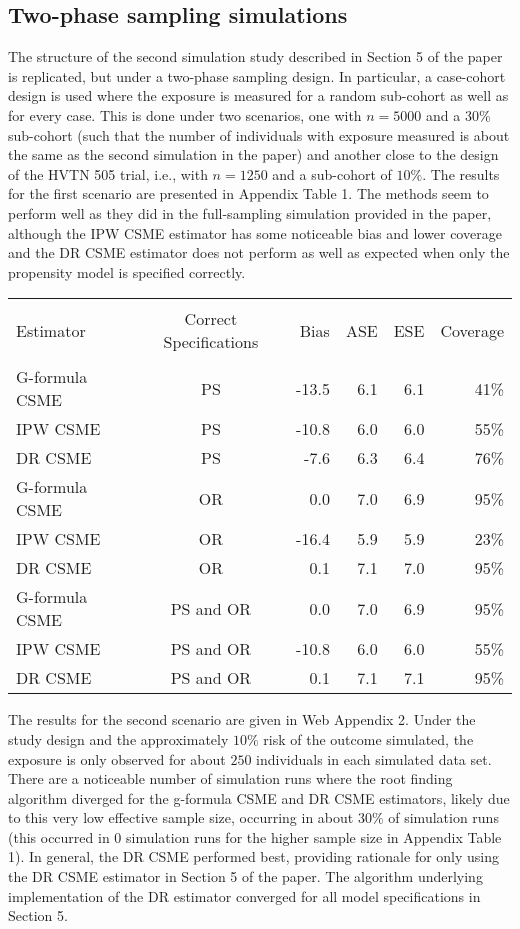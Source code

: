 \documentclass[12pt]{article}
\newcounter{tblcap}
\def\tblhead#1{\hline\\[-9pt]#1\\\hline\\[-9.75pt]}
\def\lastline{\\\hline}
\begin{document}
\subsection{Two-phase sampling simulations}

The structure of the second simulation study described in Section 5 of the paper is replicated, but under a two-phase sampling design. In particular, a case-cohort design is used where the exposure is measured for a random sub-cohort as well as for every case. This is done under two scenarios, one with $n=5000$ and a $30\%$ sub-cohort (such that the number of individuals with exposure measured is about the same as the second simulation in the paper) and another close to the design of the HVTN 505 trial, i.e., with $n=1250$ and a sub-cohort of $10\%$. The results for the first scenario are presented in Appendix Table 1. The methods seem to perform well as they did in the full-sampling simulation provided in the paper, although the IPW CSME estimator has some noticeable bias and lower coverage and the DR CSME estimator does not perform as well as expected  when only the propensity model is specified correctly.

\begin{table}[h]
{\tabcolsep=6.25pt
\begin{tabular}{@{}lcrrrr@{}}
\tblhead{Estimator & Correct Specifications & Bias & ASE & ESE & Coverage}
G-formula CSME & PS & -13.5 & 6.1 & 6.1 & 41\% \\
IPW CSME & PS & -10.8 & 6.0 & 6.0 & 55\% \\
DR CSME & PS & -7.6 & 6.3 & 6.4 & 76\% \\[3pt]
G-formula CSME & OR & 0.0 & 7.0 & 6.9 & 95\% \\
IPW CSME & OR & -16.4 & 5.9 & 5.9 & 23\% \\
DR CSME & OR & 0.1 & 7.1 & 7.0 & 95\% \\[3pt]
G-formula CSME & PS and OR & 0.0 & 7.0 & 6.9 & 95\% \\
IPW CSME & PS and OR & -10.8 & 6.0 & 6.0 & 55\% \\
DR CSME & PS and OR & 0.1 & 7.1 & 7.1 & 95\%
\lastline
\end{tabular}}
\end{table}

The results for the second scenario are given in Web Appendix 2. Under the study design and the approximately $10\%$ risk of the outcome simulated, the exposure is only observed for about $250$ individuals in each simulated data set. There are a noticeable number of simulation runs where the root finding algorithm diverged for the g-formula CSME and DR CSME estimators, likely due to this very low effective sample size, occurring in about 30$\%$ of simulation runs (this occurred in 0 simulation runs for the higher sample size in Appendix Table 1). In general, the DR CSME performed best, providing rationale for only using the DR CSME estimator in Section 5 of the paper. The algorithm underlying implementation of the DR estimator converged for all model specifications in Section 5.
\end{document}
